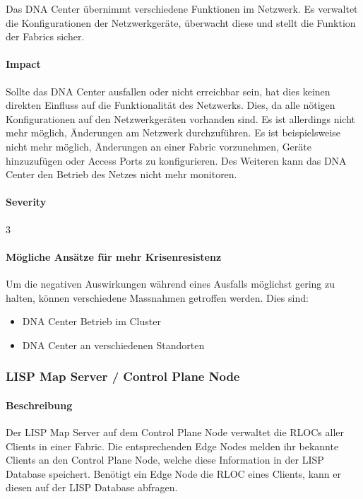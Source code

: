 Das DNA Center übernimmt verschiedene Funktionen im Netzwerk. Es verwaltet die Konfigurationen der Netzwerkgeräte, überwacht diese und stellt die Funktion der Fabrics sicher. 

\paragraph{Impact}

Sollte das DNA Center ausfallen oder nicht erreichbar sein, hat dies keinen direkten Einfluss auf die Funktionalität des Netzwerks. Dies, da alle nötigen Konfigurationen auf den Netzwerkgeräten vorhanden sind. Es ist allerdings nicht mehr möglich, Änderungen am Netzwerk durchzuführen. Es ist beispielsweise nicht mehr möglich, Änderungen an einer Fabric vorzunehmen, Geräte hinzuzufügen oder Access Ports zu konfigurieren. Des Weiteren kann das DNA Center den Betrieb des Netzes nicht mehr monitoren.

\paragraph{Severity} 3

\paragraph{Mögliche Ansätze für mehr Krisenresistenz}

Um die negativen Auswirkungen während eines Ausfalls möglichst gering zu halten, können verschiedene Massnahmen getroffen werden. Dies sind:

\begin{itemize}
\item DNA Center Betrieb im Cluster
\item DNA Center an verschiedenen Standorten
\end{itemize}

\subsubsection{LISP Map Server / Control Plane Node}

\paragraph{Beschreibung}

Der LISP Map Server auf dem Control Plane Node verwaltet die RLOCs aller Clients in einer Fabric. Die entsprechenden Edge Nodes melden ihr bekannte Clients an den Control Plane Node, welche diese Information in der LISP Database speichert. Benötigt ein Edge Node die RLOC eines Clients, kann er diesen auf der LISP Database abfragen.

